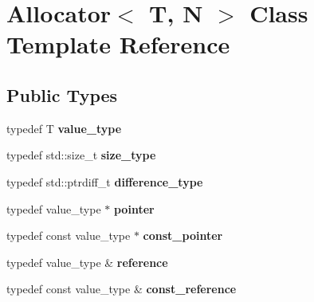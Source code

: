 \hypertarget{classAllocator}{\section{Allocator$<$ T, N $>$ Class Template Reference}
\label{classAllocator}
}
\subsection*{Public Types}
\begin{DoxyCompactItemize}
\item 
\hypertarget{classAllocator_ad5c51a128db2150e67259f697ef457b9}{typedef T {\bfseries value\-\_\-type}}\label{classAllocator_ad5c51a128db2150e67259f697ef457b9}

\item 
\hypertarget{classAllocator_aec4c70d3e80d2b7d11bbb8bd8a62f016}{typedef std\-::size\-\_\-t {\bfseries size\-\_\-type}}\label{classAllocator_aec4c70d3e80d2b7d11bbb8bd8a62f016}

\item 
\hypertarget{classAllocator_a6b650764260187e63d5098f5f38046c2}{typedef std\-::ptrdiff\-\_\-t {\bfseries difference\-\_\-type}}\label{classAllocator_a6b650764260187e63d5098f5f38046c2}

\item 
\hypertarget{classAllocator_a7df4693123ad6d168217e3853cd15495}{typedef value\-\_\-type $\ast$ {\bfseries pointer}}\label{classAllocator_a7df4693123ad6d168217e3853cd15495}

\item 
\hypertarget{classAllocator_a5815a9c01f756005eb19d0ae5aded3be}{typedef const value\-\_\-type $\ast$ {\bfseries const\-\_\-pointer}}\label{classAllocator_a5815a9c01f756005eb19d0ae5aded3be}

\item 
\hypertarget{classAllocator_adf0658602f352de03fa2d2c4f23903e9}{typedef value\-\_\-type \& {\bfseries reference}}\label{classAllocator_adf0658602f352de03fa2d2c4f23903e9}

\item 
\hypertarget{classAllocator_aff863afcf191fb225997ae2d51314bf5}{typedef const value\-\_\-type \& {\bfseries const\-\_\-reference}}\label{classAllocator_aff863afcf191fb225997ae2d51314bf5}

\end{DoxyCompactItemize}
